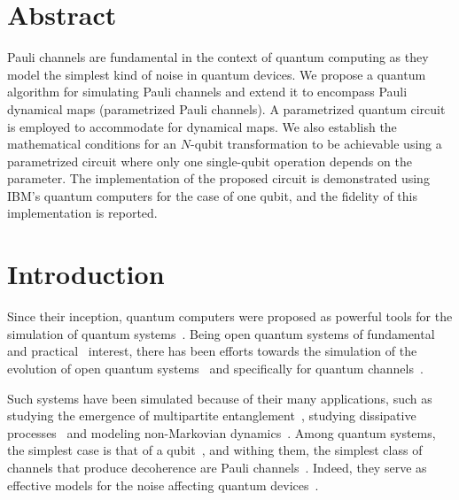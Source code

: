 \documentclass[10pt,letterpaper]{article} %
\begin{document}
\section*{Abstract}
Pauli channels are fundamental in the context of quantum computing as they
model the simplest kind of noise in quantum devices.  We propose a quantum
algorithm for simulating
Pauli channels 
and extend it to encompass Pauli dynamical maps 
(parametrized Pauli channels).
A parametrized quantum circuit is employed to accommodate for dynamical maps. 
We also establish the mathematical conditions for an
$N$-qubit transformation to be achievable using a parametrized circuit where
only one single-qubit operation depends on the parameter. 
The implementation of the proposed circuit is demonstrated using IBM's quantum computers 
for the case of one qubit, and the fidelity of this implementation is reported. 


\section{Introduction} %

Since their inception, quantum computers were proposed as powerful tools for
the simulation of quantum systems~\cite{feynman1982simulating}.  Being open
quantum systems of fundamental~\cite{Zur91,RevModPhys.76.1267} and
practical~\cite{breuer2007theory} interest, there has been efforts towards the
simulation of the evolution of open quantum systems~\cite{Garcia, Wang,Weimer}
and specifically for quantum channels~\cite{Xin,Wei,Zanetti}.

Such systems have been simulated because of their many applications, 
such as studying the emergence of multipartite entanglement~\cite{Andrea,Andrea_AD},
studying dissipative processes~\cite{Barreiro}
and modeling non-Markovian dynamics~\cite{Marsden}.
Among quantum systems, the simplest case is that of a qubit~\cite{chuangbook},
and withing them, the simplest class of channels that produce decoherence are
Pauli channels~\cite{geometry,Zbigniew,Davalos}. Indeed, they serve as
effective models for the noise affecting quantum devices~\cite{Flammia}.
\end{document}
